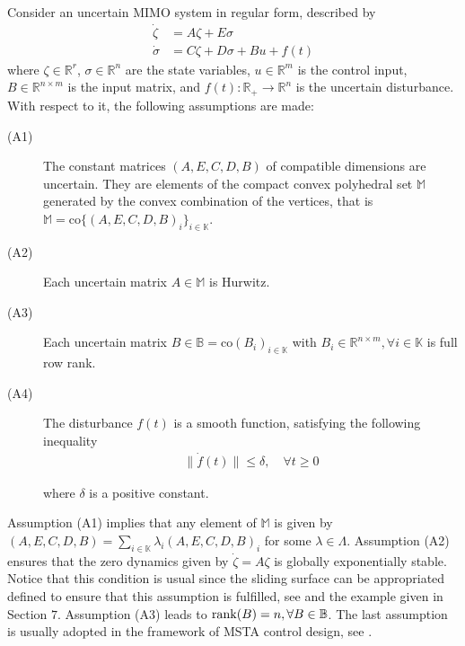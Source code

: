\documentclass[twocolumn]{autarc_LH}
\newcommand{\Rf}{{\mathbb R}}
\newcommand{\Kn}{{\mathbb K}}
\begin{document}
Consider an uncertain MIMO system in regular form, described by 
\begin{equation}
	\label{eq:main_system}
	\begin{aligned}
		\dot \zeta & = A \zeta + E \sigma \\
		\dot \sigma & = C \zeta  +  D \sigma +  B u + f(t)
	\end{aligned}
\end{equation}
where $\zeta \in \mathbb{R}^{r}$, $\sigma \in \mathbb{R}^n$ are the state variables, $u \in \mathbb{R}^m$ is the control input, $B \in \Rf^{n \times m}$  is the input matrix, and $f(t): \Rf_+ \to \Rf^n$ is the uncertain disturbance. With respect to it, the following assumptions are made:
\begin{description}
    \item[(A1)] The constant matrices $(A, E, C, D, B)$ of compatible
    dimensions are uncertain. They are elements of the compact convex polyhedral set $\mathbb{M}$ generated by the convex combination of the vertices, that is $\mathbb{M} =  \text{co} \{ (A, E, C, D, B)_i \}_{i \in \mathbb{K}}$. 

    \item[(A2)] Each uncertain matrix $A \in \mathbb{M}$ is Hurwitz.

    \item[(A3)] Each uncertain matrix $B \in {\mathbb{B}} = { \text{co}}(B_i)_{i \in \mathbb{K}}$ with $B_i \in \Rf^{n \times m}, \forall i \in \Kn$ is full row rank. 

    \item[(A4)] The disturbance $f(t)$ is a smooth function, satisfying the following inequality
    \begin{align}
    \label{eq02}
    \| \dot{f}(t) \| \leq \delta, \quad \forall t \geq 0
    \end{align}
    
where $\delta$ is a positive constant.
\end{description}

Assumption (A1) implies that any element of $\mathbb{M}$ is given by $(A, E, C, D, B) \!=\! \sum_{i \in \mathbb{K}} \lambda_i( A, E, C, D, B)_i$ for some $\lambda \in \Lambda$. Assumption (A2) ensures that the zero dynamics given by $\dot{\zeta} = A \zeta$ is globally exponentially stable. Notice that this condition is usual since the sliding surface can be appropriated defined to ensure that this assumption is fulfilled, see \cite{U:92} and the example given in Section $7$. Assumption (A3) leads to ${\rm rank}(B) = n, \forall B \in \mathbb{B}$. The last assumption is usually adopted in the framework of MSTA control design, see \cite{gero:2023}.
\end{document}
